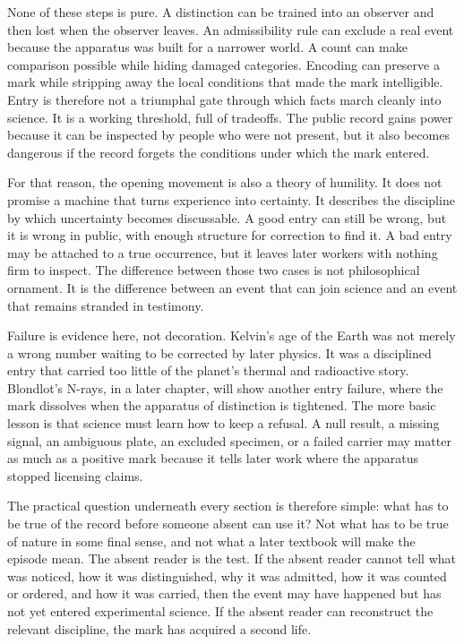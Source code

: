 \begin{chapteressay}
None of these steps is pure. A distinction can be trained into an observer and
then lost when the observer leaves. An admissibility rule can exclude a real
event because the apparatus was built for a narrower world. A count can make
comparison possible while hiding damaged categories. Encoding can preserve a
mark while stripping away the local conditions that made the mark intelligible.
Entry is therefore not a triumphal gate through which facts march cleanly into
science. It is a working threshold, full of tradeoffs. The public record gains
power because it can be inspected by people who were not present, but it also
becomes dangerous if the record forgets the conditions under which the mark
entered.

For that reason, the opening movement is also a theory of humility. It does not
promise a machine that turns experience into certainty. It describes the
discipline by which uncertainty becomes discussable. A good entry can still be
wrong, but it is wrong in public, with enough structure for correction to find
it. A bad entry may be attached to a true occurrence, but it leaves later
workers with nothing firm to inspect. The difference between those two cases is
not philosophical ornament. It is the difference between an event that can join
science and an event that remains stranded in testimony.

Failure is evidence here, not decoration. Kelvin's age of the Earth was not
merely a wrong number waiting to be corrected by later physics. It was a
disciplined entry that carried too little of the planet's thermal and
radioactive story. Blondlot's N-rays, in a later chapter, will show another
entry failure, where the mark dissolves when the apparatus of distinction is
tightened. The more basic lesson is that science must learn how to keep a
refusal. A null result, a missing signal, an ambiguous plate, an excluded
specimen, or a failed carrier may matter as much as a positive mark because it
tells later work where the apparatus stopped licensing claims.

The practical question underneath every section is therefore simple: what has
to be true of the record before someone absent can use it? Not what has to be
true of nature in some final sense, and not what a later textbook will make the
episode mean. The absent reader is the test. If the absent reader cannot tell
what was noticed, how it was distinguished, why it was admitted, how it was
counted or ordered, and how it was carried, then the event may have happened but
has not yet entered experimental science. If the absent reader can reconstruct
the relevant discipline, the mark has acquired a second life.


\end{chapteressay}
